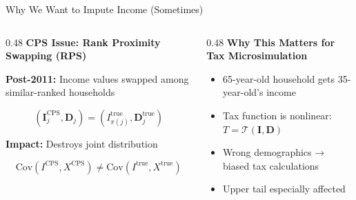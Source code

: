 \documentclass[11pt,aspectratio=169]{beamer}
\begin{document}
\begin{frame}{Why We Want to Impute Income (Sometimes)}
\begin{columns}
\begin{column}{0.48\textwidth}
\textbf{CPS Issue: Rank Proximity Swapping (RPS)}

\vspace{0.3cm}
\textbf{Post-2011:} Income values swapped among similar-ranked households

\vspace{0.2cm}
$$(\mathbf{I}_j^{\text{CPS}}, \mathbf{D}_j) = (I_{\pi(j)}^{\text{true}}, \mathbf{D}_j^{\text{true}})$$

\vspace{0.2cm}
\textbf{Impact:} Destroys joint distribution

$$\text{Cov}(I^{\text{CPS}}, X^{\text{CPS}}) \neq \text{Cov}(I^{\text{true}}, X^{\text{true}})$$

\end{column}

\begin{column}{0.48\textwidth}
\textbf{Why This Matters for Tax Microsimulation}

\begin{itemize}
    \item 65-year-old household gets 35-year-old's income
    \item Tax function is nonlinear: $T = \mathcal{T}(\mathbf{I}, \mathbf{D})$
    \item Wrong demographics → biased tax calculations
    \item Upper tail especially affected
\end{itemize}

\end{column}
\end{columns}
\end{frame}
\end{document}
